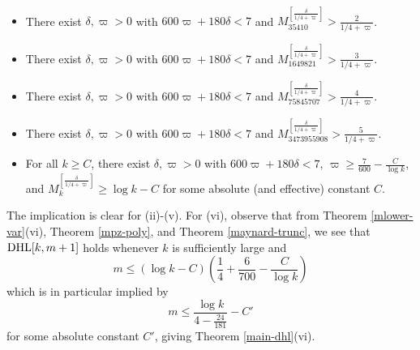 \begin{theorem}\label{mlower-var}\
\begin{itemize}
\item[(ii)] There exist $\delta,\varpi>0$ with $600 \varpi + 180 \delta < 7$ and $M_{\num{35410}}^{[\frac{\delta}{1/4+\varpi}]} > \frac{2}{1/4+\varpi}$.
\item[(iii)] There exist $\delta,\varpi>0$ with $600 \varpi + 180 \delta < 7$ and $M_{\num{1649821}}^{[\frac{\delta}{1/4+\varpi}]} > \frac{3}{1/4+\varpi}$.
\item[(iv)] There exist $\delta,\varpi>0$ with $600 \varpi + 180 \delta < 7$ and $M_{\num{75845707}}^{[\frac{\delta}{1/4+\varpi}]} > \frac{4}{1/4+\varpi}$.
\item[(v)] There exist $\delta,\varpi>0$ with $600 \varpi + 180 \delta < 7$ and $M_{\num{3473955908}}^{[\frac{\delta}{1/4+\varpi}]} > \frac{5}{1/4+\varpi}$.
\item[(vi)] For all $k \geq C$, there exist $\delta,\varpi>0$ with $600 \varpi + 180 \delta < 7$, $\varpi \geq \frac{7}{600} - \frac{C}{\log k}$, and $M_k^{[\frac{\delta}{1/4+\varpi}]} \geq \log k - C$ for some absolute (and effective) constant $C$.
\end{itemize}
\end{theorem}

The implication is clear for (ii)-(v).  For (vi), observe that from Theorem \ref{mlower-var}(vi), Theorem \ref{mpz-poly}, and Theorem \ref{maynard-trunc}, we see that $\operatorname*{DHL}[k,m+1]$ holds whenever $k$ is sufficiently large and
$$ m \leq (\log k - C) \left(\frac{1}{4} + \frac{6}{700} - \frac{C}{\log k}\right)$$
which is in particular implied by
$$ m \leq \frac{\log k}{4 - \frac{24}{181}} - C'$$
for some absolute constant $C'$, giving Theorem \ref{main-dhl}(vi).

